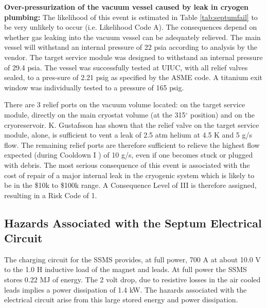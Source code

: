 {{\bf Over-pressurization of the vacuum vessel caused by leak in cryogen plumbing:} The likelihood 
of this event is estimated in Table \ref{tab:septumfail} to be very unlikely to occur (i.e. Likelihood Code A).  The 
consequences depend on whether gas leaking into the vacuum vessel can be adequately relieved.  The 
main vessel will withstand an internal pressure of 22 psia according to analysis by the vendor. The 
target service module was designed to withstand an internal pressure of 29.4 psia.  The vessel was 
successfully tested at UIUC, with all relief valves sealed, to a pres-sure of 2.21 psig as specified by 
the ASME code.  A titanium exit window was individually tested to a pressure of 165 psig.

There are 3 relief ports on the vacuum volume located: on the target service module, directly on the main 
cryostat volume (at the 315$^\circ$ position) and on the cryoreservoir.  K. Gustafsson has shown 
 that the relief valve on the target service module, alone, is sufficient to vent a leak of 2.5 atm 
helium at 4.5 K and 5 g/s flow.  The remaining relief ports are therefore sufficient to relieve the 
highest flow expected (during Cooldown I ) of 10 g/s, even if one becomes stuck or plugged with debris.  
The most serious consequence of this event is associated with the cost of repair of a major internal leak 
in the cryogenic system which is likely to be in the \$10k to \$100k range.  A Consequence Level of III is 
therefore assigned, resulting in a Risk Code of 1.

\begin{safetyen}{10}{15}
\subsection {\bf Hazards Associated with the Septum Electrical Circuit}
\end{safetyen}

The charging circuit for the SSMS provides, at full power, 700 A at about 10.0  V to the 1.0  H inductive 
load of the magnet and leads.  At full power the SSMS stores 0.22 MJ of energy.  The 2 volt drop, due to 
resistive losses in the air cooled leads implies a power dissipation of 1.4 kW.  The hazards associated 
with the electrical circuit arise from this large stored energy and power dissipation.

\begin{safetyen}{10}{15}

\end{safetyen}}
